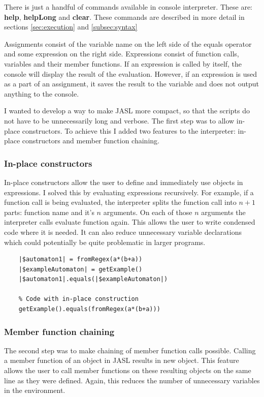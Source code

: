\documentclass{ctuthesis}
\begin{document}
There is just a handful of commands available in console interpreter. These are: \textbf{help}, \textbf{helpLong} and \textbf{clear}. These commands are described in more detail in sections \ref{sec:execution} and \ref{subsec:syntax}

Assignments consist of the variable name on the left side of the equals operator and some expression on the right side. Expressions consist of function calls, variables and their member functions. If an expression is called by itself, the console will display the result of the evaluation. However, if an expression is used as a part of an assignment, it saves the result to the variable and does not output anything to the console. 

I wanted to develop a way to make JASL more compact, so that the scripts do not have to be unnecessarily long and verbose. The first step was to allow in-place constructors. To achieve this I added two features to the interpreter: in-place constructors and member function chaining.

\subsubsection{In-place constructors}
In-place constructors allow the user to define and immediately use objects in expressions. I solved this by evaluating expressions recursively. For example, if a function call is being evaluated, the interpreter splits the function call into $n+1$ parts: function name and it's $n$ arguments. On each of those $n$ arguments the interpreter calls evaluate function again. This allows the user to write condensed code where it is needed. It can also reduce unnecessary variable declarations which could potentially be quite problematic in larger programs.

\begin{minipage}{\linewidth}
\begin{lstlisting}[language = JASL]
	% Code without in-place construction
	|$automaton1| = fromRegex(a*(b+a))
	|$exampleAutomaton| = getExample()
	|$automaton1|.equals(|$exampleAutomaton|)
	
	% Code with in-place construction
	getExample().equals(fromRegex(a*(b+a)))
\end{lstlisting}
\end{minipage}

\subsubsection{Member function chaining}
\label{chaining_impl}
The second step was to make chaining of member function calls possible. Calling a member function of an object in JASL results in new object. This feature allows the user to call member functions on these resulting objects on the same line as they were defined. Again, this reduces the number of unnecessary variables in the environment.
\end{document}
